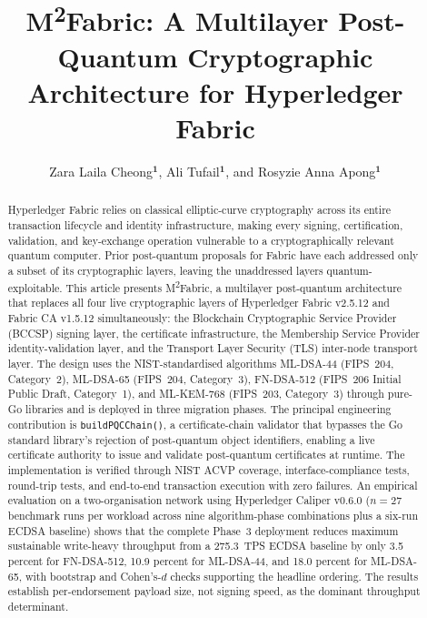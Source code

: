 \documentclass{ieeetj}
\newcommand{\mfabric}{M\textsuperscript{2}Fabric}
\def\authorrefmark#1{\ensuremath{^{\textbf{#1}}}}
\begin{document}


\title{\mfabric{}: A Multilayer Post-Quantum Cryptographic Architecture for Hyperledger Fabric}

\author{Zara Laila Cheong\authorrefmark{1}, Ali Tufail\authorrefmark{1}, and Rosyzie Anna Apong\authorrefmark{1}}


\begin{abstract}
{Hyperledger Fabric relies on classical elliptic-curve cryptography across its
entire transaction lifecycle and identity infrastructure, making every signing,
certification, validation, and key-exchange operation vulnerable to a
cryptographically relevant quantum computer. Prior post-quantum proposals for
Fabric have each addressed only a subset of its cryptographic layers, leaving
the unaddressed layers quantum-exploitable. This article presents \mfabric{}, a
multilayer post-quantum architecture that replaces all four live cryptographic
layers of Hyperledger Fabric v2.5.12 and Fabric CA v1.5.12 simultaneously: the
Blockchain Cryptographic Service Provider (BCCSP) signing layer, the
certificate infrastructure, the Membership Service Provider
identity-validation layer, and the Transport Layer Security (TLS) inter-node
transport layer. The design uses the NIST-standardised algorithms ML-DSA-44
(FIPS~204, Category~2), ML-DSA-65 (FIPS~204, Category~3), FN-DSA-512
(FIPS~206 Initial Public Draft, Category~1), and ML-KEM-768 (FIPS~203,
Category~3) through pure-Go libraries and is deployed in three migration
phases. The principal engineering contribution is \texttt{buildPQCChain()},
a certificate-chain validator that bypasses the Go standard library's
rejection of post-quantum object identifiers, enabling a live certificate
authority to issue and validate post-quantum certificates at runtime. The
implementation is verified through NIST ACVP coverage, interface-compliance
tests, round-trip tests, and end-to-end transaction execution with zero
failures. An empirical evaluation on a two-organisation network using
Hyperledger Caliper v0.6.0 ($n=27$ benchmark runs per workload across nine
algorithm-phase combinations plus a six-run ECDSA baseline) shows that the
complete Phase~3 deployment reduces maximum sustainable write-heavy
throughput from a 275.3~TPS ECDSA baseline by only 3.5 percent for
FN-DSA-512, 10.9 percent for ML-DSA-44, and 18.0 percent for ML-DSA-65,
with bootstrap and Cohen's-$d$ checks supporting the headline ordering. The
results establish per-endorsement payload size, not signing speed, as the
dominant throughput determinant.}
\end{abstract}
\end{document}
